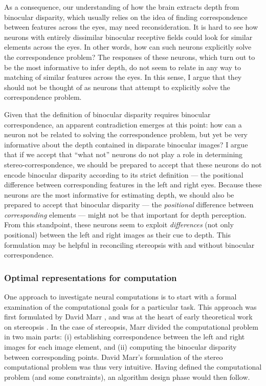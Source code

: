As a consequence, our understanding of how the brain extracts depth from binocular disparity, which usually relies on the idea of finding correspondence between features across the eyes, may need reconsideration. It is hard to see how neurons with entirely dissimilar binocular receptive fields could look for similar elements across the eyes. In other words, how can such neurons explicitly solve the correspondence problem? The responses of these neurons, which turn out to be the most informative to infer depth, do not seem to relate in any way to matching of similar features across the eyes. In this sense, I argue that they should not be thought of as neurons that attempt to explicitly solve the correspondence problem.

Given that the definition of binocular disparity requires binocular correspondence, an apparent contradiction emerges at this point: how can a neuron not be related to solving the correspondence problem, but yet be very informative about the depth contained in disparate binocular images? I argue that if we accept that ``what not'' neurons do not play a role in determining stereo-correspondence, we should be prepared to accept that these neurons do not encode binocular disparity according to its strict definition --- the positional difference between corresponding features in the left and right eyes. Because these neurons are the most informative for estimating depth, we should also be prepared to accept that binocular disparity --- the \textit{positional} difference between \textit{corresponding} elements --- might not be that important for depth perception. From this standpoint, these neurons seem to exploit \textit{differences} (not only positional) between the left and right images as their cue to depth. This formulation may be helpful in reconciling stereopsis with and without binocular correspondence.


\subsubsection*{Optimal representations for computation}

One approach to investigate neural computations is to start with a formal examination of the computational goals for a particular task. This approach was first formulated by David Marr \cite{Marr:1976dq,Marr:1982:VCI:1095712}, and was at the heart of early theoretical work on stereopsis \cite{Sperling:1970ys,Marr:1976dq}. In the case of stereopsis, Marr divided the computational problem in two main parts: (i) establishing correspondence between the left and right images for each image element, and (ii) computing the binocular disparity between corresponding points. David Marr's formulation of the stereo computational problem was thus very intuitive. Having defined the computational problem (and some constraints), an algorithm design phase would then follow.

